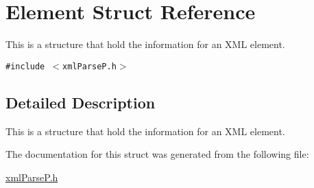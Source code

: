 \hypertarget{structElement}{
\section{Element Struct Reference}
\label{structElement}
}
This is a structure that hold the information for an XML element.  


{\tt \#include $<$xmlParseP.h$>$}



\subsection{Detailed Description}
This is a structure that hold the information for an XML element. 

The documentation for this struct was generated from the following file:\begin{CompactItemize}
\item 
\hyperlink{xmlParseP_8h}{xmlParseP.h}\end{CompactItemize}
